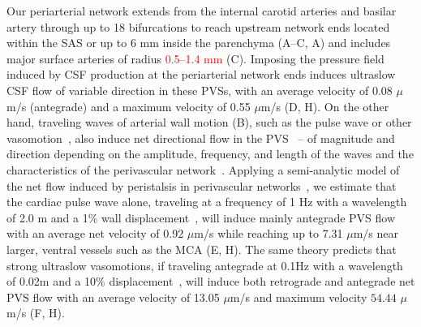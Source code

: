 \documentclass[fleqn,10pt]{wlscirep}
\newcommand{\discuss}[1]{\textcolor{red}{#1}}
\begin{document}
Our periarterial network extends from the internal carotid arteries
and basilar artery through up to 18 bifurcations to reach upstream
network ends located within the SAS or up to 6 mm inside the parenchyma
(A--C, A) and includes major surface
arteries of radius \discuss{0.5--1.4 mm} (C). Imposing
the pressure field induced by CSF production at the periarterial
network ends induces ultraslow CSF flow of variable direction in these
PVSs, with an average velocity of 0.08 $\mu$m/s (antegrade) and a
maximum velocity of 0.55 $\mu$m/s (D, H). On the other
hand, traveling waves of arterial wall motion (B), such
as the pulse wave or other vasomotion~\cite{vanveluw2020vasomotion,
  munting2023spontaneous, bojarskaite2023sleep, broggini2024long},
also induce net directional flow in the
PVS~\cite{kedarasetti2020arterial, kedarasetti2020functional,
  coenen2021lubrication, gjerde2023directional, nozaleda2024arterial}
-- of magnitude and direction depending on the amplitude, frequency,
and length of the waves and the characteristics of the perivascular
network~\cite{gjerde2023directional}. Applying a semi-analytic model
of the net flow induced by peristalsis in perivascular
networks~\cite{gjerde2023directional}, we estimate that the cardiac
pulse wave alone, traveling at a frequency of 1 Hz with a wavelength
of 2.0 m and a 1\% wall displacement~\cite{jung2021novel}, will induce
mainly antegrade PVS flow with an average net velocity of 0.92
$\mu$m/s while reaching up to 7.31 $\mu$m/s near larger, ventral
vessels such as the MCA (E, H). The same theory predicts
that strong ultraslow vasomotions, if traveling antegrade at 0.1Hz
with a wavelength of 0.02m and a 10\%
displacement~\cite{broggini2024long}, will induce both retrograde and
antegrade net PVS flow with an average velocity of 13.05 $\mu$m/s and
maximum velocity $54.44$ $\mu$m/s (F, H).
\end{document}
